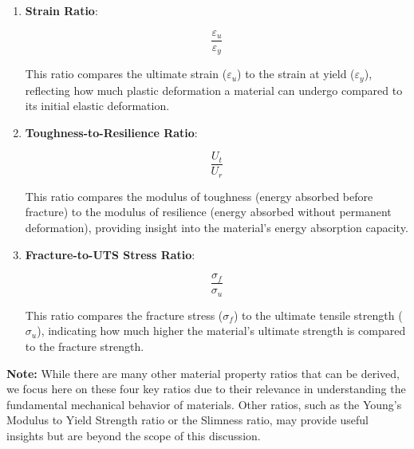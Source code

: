 \documentclass{article}
\begin{document}
{\begin{enumerate}
    \item \textbf{Strain Ratio}:\\[8pt]
    \begin{minipage}{0.3\textwidth}
        \begin{equation}
            \frac{\varepsilon_u}{\varepsilon_y}
        \end{equation}
    \end{minipage}\hfill
    \begin{minipage}{0.6\textwidth}
        This ratio compares the ultimate strain (\(\varepsilon_u\)) to the strain at yield (\(\varepsilon_y\)), reflecting how much plastic deformation a material can undergo compared to its initial elastic deformation.
    \end{minipage}
    
    \item \textbf{Toughness-to-Resilience Ratio}:\\[8pt]
    \begin{minipage}{0.3\textwidth}
        \begin{equation}
            \frac{U_t}{U_r}
        \end{equation}
    \end{minipage}\hfill
    \begin{minipage}{0.6\textwidth}
        This ratio compares the modulus of toughness (energy absorbed before fracture) to the modulus of resilience (energy absorbed without permanent deformation), providing insight into the material's energy absorption capacity.
    \end{minipage}
    
    \item \textbf{Fracture-to-UTS Stress Ratio}:\\[8pt]
    \begin{minipage}{0.3\textwidth}
        \begin{equation}
            \frac{\sigma_f}{\sigma_u}
        \end{equation}
    \end{minipage}\hfill
    \begin{minipage}{0.6\textwidth}
        This ratio compares the fracture stress (\(\sigma_f\)) to the ultimate tensile strength (\(\sigma_u\)), indicating how much higher the material's ultimate strength is compared to the fracture strength.
    \end{minipage}
    
\end{enumerate}
\vspace{1em}
\textbf{Note:} While there are many other material property ratios that can be derived, we focus here on these four key ratios due to their relevance in understanding the fundamental mechanical behavior of materials. Other ratios, such as the Young’s Modulus to Yield Strength ratio or the Slimness ratio, may provide useful insights but are beyond the scope of this discussion.

}
\end{document}
